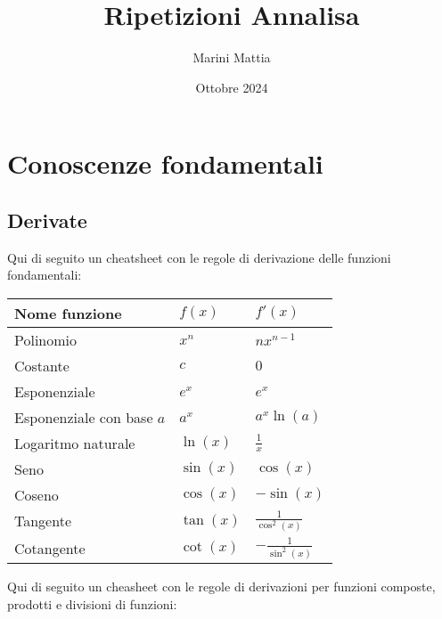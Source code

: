 
\title{Ripetizioni Annalisa}
\author{Marini Mattia}
\date{Ottobre 2024}


\maketitle
{}

\tableofcontents

\newpage
\section{Conoscenze fondamentali}
\subsection{Derivate}
\renewcommand{\arraystretch}{1.4}
Qui di seguito un cheatsheet con le regole di derivazione delle funzioni fondamentali:
\begin{center}
	\begin{tabular}{l l l}
		\hline
		Nome funzione               & $ f\left(x\right) $ & $f'(x)$                     \\
		\hline
		Polinomio                   & $  x^{n} $          & $  n  x^{n-1} $             \\
		Costante                    & $  c $              & $  0 $                      \\
		Esponenziale                & $  e^{x} $          & $  e^{x} $                  \\
		Esponenziale con base $ a $ & $  a^{x} $          & $  a^{x} \ln(a) $           \\
		Logaritmo naturale          & $  \ln(x) $         & $  \frac{1}{x} $            \\
		Seno                        & $  \sin(x) $        & $  \cos(x) $                \\
		Coseno                      & $  \cos(x) $        & $  -\sin(x) $               \\
		Tangente                    & $  \tan(x) $        & $  \frac{1}{\cos^{2}(x)} $  \\
		Cotangente                  & $  \cot(x) $        & $  -\frac{1}{\sin^{2}(x)} $ \\
		\hline
	\end{tabular}
\end{center}
\renewcommand{\arraystretch}{1}
Qui di seguito un cheasheet con le regole di derivazioni per funzioni composte, prodotti e divisioni di funzioni:
